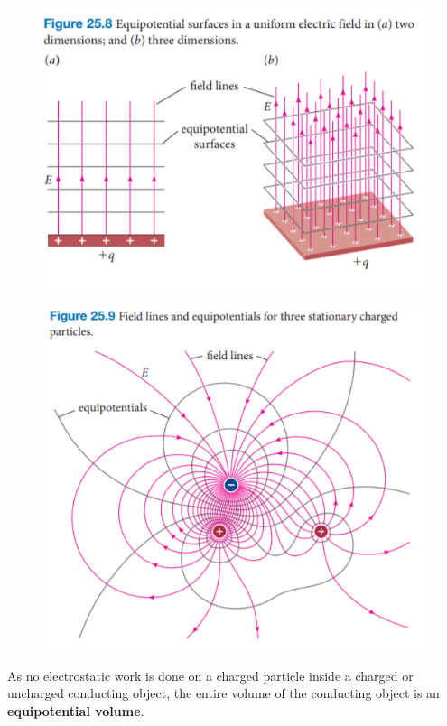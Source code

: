         \begin{figure}[hbt!]
            \centering
            \includegraphics[scale = 0.75]{Resources/25.3_Equipotentials}
        \end{figure}

        \begin{figure}[hbt!]
            \centering
            \includegraphics[scale = 0.75]{Resources/25.3_Equipotentials2}
        \end{figure}

        As no electrostatic work is done on a charged particle inside a charged or uncharged conducting object, the entire volume of the conducting object is an \textbf{equipotential volume}.


